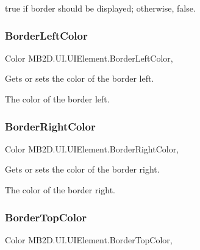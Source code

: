 {\ttfamily true} if border should be displayed; otherwise, {\ttfamily false}.\hypertarget{class_m_b2_d_1_1_u_i_1_1_u_i_element_aef07fe4fd9fef08485aa7265f4b9128b}{}\label{class_m_b2_d_1_1_u_i_1_1_u_i_element_aef07fe4fd9fef08485aa7265f4b9128b} 
\subsubsection{\texorpdfstring{Border\+Left\+Color}{BorderLeftColor}}
{\footnotesize\ttfamily Color M\+B2\+D.\+U\+I.\+U\+I\+Element.\+Border\+Left\+Color\hspace{0.3cm}{\ttfamily [get]}, {\ttfamily [set]}}



Gets or sets the color of the border left. 

The color of the border left.\hypertarget{class_m_b2_d_1_1_u_i_1_1_u_i_element_ad9ccf8afb8798ad432e3e08872101bf4}{}\label{class_m_b2_d_1_1_u_i_1_1_u_i_element_ad9ccf8afb8798ad432e3e08872101bf4} 
\subsubsection{\texorpdfstring{Border\+Right\+Color}{BorderRightColor}}
{\footnotesize\ttfamily Color M\+B2\+D.\+U\+I.\+U\+I\+Element.\+Border\+Right\+Color\hspace{0.3cm}{\ttfamily [get]}, {\ttfamily [set]}}



Gets or sets the color of the border right. 

The color of the border right.\hypertarget{class_m_b2_d_1_1_u_i_1_1_u_i_element_aa45f78b02d01b2dbec6b4fc217931893}{}\label{class_m_b2_d_1_1_u_i_1_1_u_i_element_aa45f78b02d01b2dbec6b4fc217931893} 
\subsubsection{\texorpdfstring{Border\+Top\+Color}{BorderTopColor}}
{\footnotesize\ttfamily Color M\+B2\+D.\+U\+I.\+U\+I\+Element.\+Border\+Top\+Color\hspace{0.3cm}{\ttfamily [get]}, {\ttfamily [set]}}




